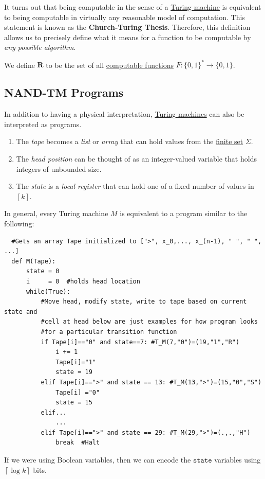   It turns out that being computable in the sense of a \hyperref[def:turing-machine]{Turing machine} is equivalent to being computable in virtually any reasonable model of computation. This statement is known as the \textbf{Church-Turing Thesis}. Therefore, this definition allows us to precisely define what it means for a function to be computable by \textit{any possible algorithm}. 

  \begin{definition}
    \label{def:the-class-r}
    We define $\textbf{R}$ to be the set of all \hyperref[def:computable-functions]{computable functions} $F: \{0,1\}^* \to \{0,1\}$. 
  \end{definition}

  \subsection{NAND-TM Programs}

  In addition to having a physical interpretation, \hyperref[def:turing-machine]{Turing machines} can also be interpreted as programs. 
  \begin{enumerate}
      \item The \textit{tape} becomes a \textit{list} or \textit{array} that can hold values from the \hyperref[st-def:finite-set]{finite set} $\Sigma$. 
      \item The \textit{head position} can be thought of as an integer-valued variable that holds integers of unbounded size. 
      \item The \textit{state} is a \textit{local register} that can hold one of a fixed number of values in $[k]$. 
  \end{enumerate}
  In general, every Turing machine $M$ is equivalent to a program similar to the following: 
  \begin{lstlisting}
  #Gets an array Tape initialized to [">", x_0,..., x_(n-1), " ", " ", ...]
  def M(Tape): 
      state = 0
      i     = 0  #holds head location
      while(True): 
          #Move head, modify state, write to tape based on current state and 
          #cell at head below are just examples for how program looks 
          #for a particular transition function
          if Tape[i]=="0" and state==7: #T_M(7,"0")=(19,"1","R") 
              i += 1
              Tape[i]="1"
              state = 19
          elif Tape[i]==">" and state == 13: #T_M(13,">")=(15,"0","S")
              Tape[i] ="0"
              state = 15
          elif... 
              ...
          elif Tape[i]==">" and state == 29: #T_M(29,">")=(.,.,"H")
              break  #Halt
  \end{lstlisting}
  If we were using Boolean variables, then we can encode the $\texttt{state}$ variables using $\left\lceil{\log k}\right\rceil$ bits. 

